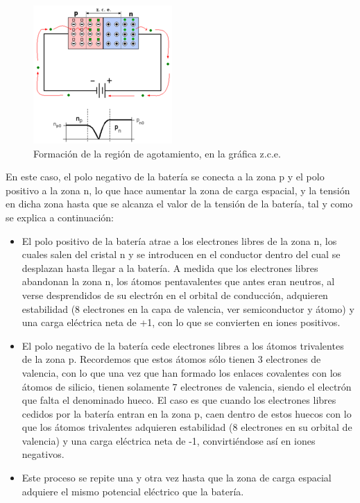 \documentclass{article}
\begin{document}
\begin{figure}[h!]
\centering
\includegraphics[scale=0.7]{PolInv.png}
\caption{Formación de la región de agotamiento, en la gráfica z.c.e.}
\label{fig:diodoInv}
\end{figure}

En este caso, el polo negativo de la batería se conecta a la zona p y el polo positivo a la zona n, lo que hace aumentar la zona de carga espacial, y la tensión en dicha zona hasta que se alcanza el valor de la tensión de la batería, tal y como se explica a continuación:\citep{diodoWiki}\\


\begin{itemize}
    \item El polo positivo de la batería atrae a los electrones libres de la zona n, los cuales salen del cristal n y se introducen en el conductor dentro del cual se desplazan hasta llegar a la batería. A medida que los electrones libres abandonan la zona n, los átomos pentavalentes que antes eran neutros, al verse desprendidos de su electrón en el orbital de conducción, adquieren estabilidad (8 electrones en la capa de valencia, ver semiconductor y átomo) y una carga eléctrica neta de +1, con lo que se convierten en iones positivos.
    \item El polo negativo de la batería cede electrones libres a los átomos trivalentes de la zona p. Recordemos que estos átomos sólo tienen 3 electrones de valencia, con lo que una vez que han formado los enlaces covalentes con los átomos de silicio, tienen solamente 7 electrones de valencia, siendo el electrón que falta el denominado hueco. El caso es que cuando los electrones libres cedidos por la batería entran en la zona p, caen dentro de estos huecos con lo que los átomos trivalentes adquieren estabilidad (8 electrones en su orbital de valencia) y una carga eléctrica neta de -1, convirtiéndose así en iones negativos.
    \item Este proceso se repite una y otra vez hasta que la zona de carga espacial adquiere el mismo potencial eléctrico que la batería.
    
    
\end{itemize}
\end{document}

